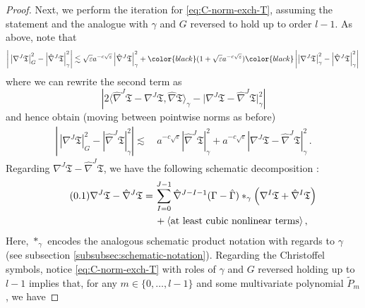 \documentclass[11pt,leqno,textwidth=10cm]{amsart}
\numberwithin{equation}{section}
\theoremstyle{definition}
\theoremstyle{plain}
\newcommand{\1}{\mathbbm{1}}
\renewcommand{\epsilon}{\varepsilon}
\newcommand{\Gamhat}{\hat{\Gamma}}
\newcommand{\nabhat}{\hat{\nabla}}
\newcommand{\numberthis}{\addtocounter{equation}{1}\tag{\theequation}}
\renewcommand{\theequation}{\arabic{section}.\arabic{equation}}
\newcommand{\change}[1]{\color{black}#1\color{black}}
\newcommand{\delete}[1]{}
\begin{document}
\begin{proof}
Next, we perform the iteration for \eqref{eq:C-norm-exch-T}, assuming the statement and the analogue with $\gamma$ and $G$ reversed to hold \change{up to order $l-1$}. As above, note that
\begin{equation*}
\left\lvert\,\left\lvert\nabla^J\mathfrak{T}\right\rvert_G^2-\left\lvert\nabhat^J\mathfrak{T}\right\rvert_\gamma^2\right\rvert\lesssim\sqrt{\epsilon}a^{-c\sqrt{\epsilon}}\left\lvert\nabhat^J\mathfrak{T}\right\rvert_\gamma^2+\change{(1+\sqrt{\epsilon}a^{-c\sqrt{\epsilon}})}\left\lvert\left\lvert\nabla^J\mathfrak{T}\right\rvert_\gamma^2-\left\lvert\nabhat^J\mathfrak{T}\right\rvert_\gamma^2\right\rvert\,
\end{equation*}
where we can rewrite the second term as
\begin{equation*}
\left\lvert 2\langle\nabhat^J\mathfrak{T}-\nabla^J\mathfrak{T},\nabhat\mathfrak{T}\rangle_\gamma-\lvert\nabla^J\mathfrak{T}-\nabhat^J\mathfrak{T}\rvert_\gamma^2\right\rvert
\end{equation*}
and hence obtain (moving between pointwise norms as before)
\begin{align*}
\left\lvert\,\left\lvert\nabla^J\mathfrak{T}\right\rvert_G^2-\left\lvert\nabhat^J\mathfrak{T}\right\rvert_\gamma^2\right\rvert%
\lesssim&\,a^{-c\sqrt{\epsilon}}\left\lvert\nabhat^J\mathfrak{T}\right\rvert_\gamma^2+a^{-c\sqrt{\epsilon}}\left\lvert \nabla^J\mathfrak{T}-\nabhat^J\mathfrak{T}\right\rvert_\gamma^2\,.
\end{align*}
Regarding $\nabla^J\mathfrak{T}-\nabhat^J\mathfrak{T}$, we have the following schematic decomposition \delete{locally on some coordinate neighbourhood $V\subseteq\Sigma_t$}:
\begin{align*}
\numberthis\label{eq:nabla-nabhat}\nabla^J\mathfrak{T}-\nabhat^J\mathfrak{T}=&\,\sum_{I=0}^{J-1}\nabhat^{J-I-1}(\Gamma-\Gamhat)\ast_\gamma\left(\nabla^{I}\mathfrak{T}+\nabhat^{I}\mathfrak{T}\right)\\
&\,+\langle\text{at least cubic nonlinear terms}\rangle\,,
\end{align*} 
Here, $\ast_\gamma$ encodes the analogous schematic product notation with regards to $\gamma$ (see subsection \ref{subsubsec:schematic-notation}). Regarding the Christoffel symbols, notice \eqref{eq:C-norm-exch-T} with roles of $\gamma$ and $G$ reversed holding up to $l-1$ implies that, for any $m\in\{0,\dots,l-1\}$ and some multivariate polynomial $\tilde{P}_m$, we have

\end{proof}
\end{document}
